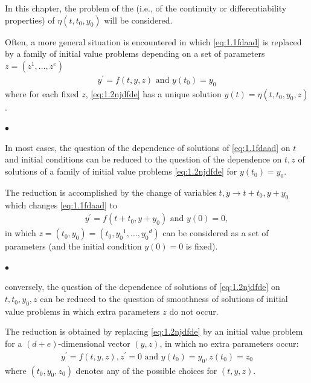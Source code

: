\documentclass{article}
\begin{document}
In this chapter, the problem of the  (i.e., of the continuity or differentiability properties) of $\eta\left(t, t_{0}, y_{0}\right)$ will be considered.

Often, a more general situation is encountered in which \cref{eq:1.1fdaad} is replaced by a family of initial value problems depending on a set of parameters $z=\left(z^{1}, \ldots, z^{e}\right)$
\begin{align}
y^{\prime}=f(t, y, z) \text { and } y\left(t_{0}\right)=y_{0}\label{eq:1.2njdfde}
\end{align}
where for each fixed $z$, \cref{eq:1.2njdfde} has a unique solution $y(t)=\eta\left(t, t_{0}, y_{0}, z\right)$. 

$\bullet$ 

In most cases, the question of the dependence of solutions of \cref{eq:1.1fdaad} on $t$ and initial conditions can be reduced to the question of the dependence on $t, z$ of solutions of a family of initial value problems \cref{eq:1.2njdfde} for  $y\left(t_{0}\right)=y_{0}$.

The reduction is accomplished by the change of variables $t, y \rightarrow t+t_{0}, y+y_{0}$ which changes \cref{eq:1.1fdaad} to
\begin{align}
    y^{\prime}=f\left(t+t_{0}, y+y_{0}\right)\text{ and }y(0)=0,
\end{align}
in which $z=\left(t_{0}, y_{0}\right)=\left(t_{0}, y_{0}{ }^{1}, \ldots, y_{0}{ }^{d}\right)$ can be considered as a set of parameters (and the initial condition $y(0)=0$ is fixed). 

$\bullet$ 

conversely, the question of the dependence of solutions of \cref{eq:1.2njdfde} on $t, t_{0}, y_{0}, z$ can be reduced to the question of smoothness of solutions of initial value problems in which extra parameters $z$ do not occur. 


The  reduction is obtained by replacing \cref{eq:1.2njdfde} by an initial value problem for a $(d+e)$-dimensional vector $(y, z)$, in which no extra parameters occur:
\begin{align}
    y^{\prime}=f(t, y, z), z^{\prime}=0\text{ and }y\left(t_{0}\right)=y_{0}, z\left(t_{0}\right)=z_{0}\label{eq:jcnada}
\end{align}
where $\left(t_{0}, y_{0}, z_{0}\right)$ denotes any of the possible choices for $(t, y, z)$. 
\end{document}
